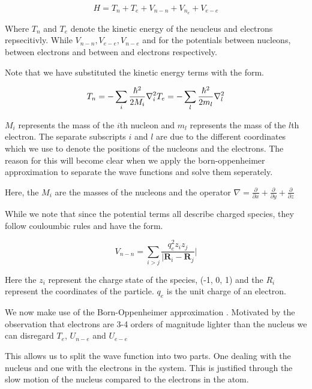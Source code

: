 \begin {equation}
H = T_n + T_e + V_{n-n} + V_{n_e} + V_{e-e}
\end{equation}

Where $T_n$ and $T_e$ denote the kinetic energy of the neucleus and electrons repsecitivly. While $V_{n-n}, V_{e-e}, V_{n-e}$ and for the potentials between nucleons, between  electrons and between and electrons respectively.

Note that we have substituted the kinetic energy terms with the form. 

\begin {equation}
T_n = - \sum_i \frac{\hbar^2}{2M_i} \nabla_i ^2 \\ 
T_e = - \sum_l \frac{\hbar^2}{2m_l} \nabla_l ^2
\end {equation}

$M_i$ represents the mass of the $i$th nucleon and $m_l$ represents the mass of the $l$th electron. The separate subscripts $i$ and $l$ are due to the different coordinates which we use to denote the positions of the nucleons and the electrons. The reason for this will become clear when we apply the born-oppenheimer approximation to separate the wave functions and solve them seperately.

Here, the $M_i$ are the masses of the nucleons and the operator $\nabla = \frac{\partial}{\partial x} + \frac{\partial }{\partial y} + \frac{\partial}{\partial z} $


While we note that since the potential terms all describe charged species, they follow couloumbic rules and have the form.

\begin{equation}
	V_{n-n} = \sum_{i>j} \frac{q_e^2 z_i z_j }{|\textbf{R}_i-\textbf{R}_j}|
\end{equation}



Here the $z_i$ represent the charge state of the species, (-1, 0, 1) and the $R_i$ represent the coordinates of the particle. $q_e$ is the unit charge of an electron.

We now make use of the Born-Oppenheimer approximation \cite{Born1927}. Motivated by the observation that electrons are 3-4 orders of magnitude lighter than the nucleus we can disregard $T_e$, $U_{n-e}$ and $U_{e-e}$

This allows us to split the wave function into two parts. One dealing with the nucleus and one with the electrons in the system. This is justified through the slow motion of the nucleus compared to the electrons in the atom.
